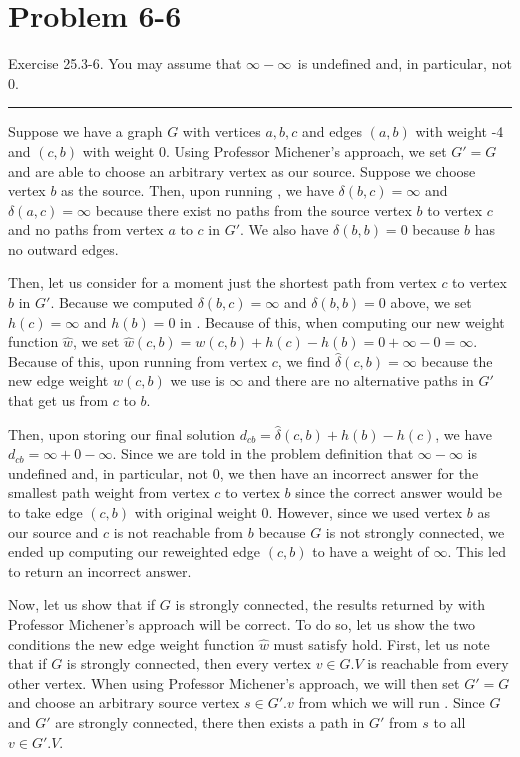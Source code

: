 \documentclass[11pt]{article}
\def\separateline{\medskip\hrule\medskip}
\begin{document}
\newpage


\section{Problem 6-6}
Exercise 25.3-6. You may assume that $\infty - \infty ~$ is undefined and, in particular, not 0.
\separateline

Suppose we have a graph $G$ with vertices $a,b,c$ and edges $(a,b)$ with weight -4 and $(c,b)$ with weight 0. Using Professor Michener's approach, we set $G' = G$ and are able to choose an arbitrary vertex as our source. Suppose we choose vertex $b$ as the source. Then, upon running , we have $\delta{(b,c)} = \infty$ and $\delta{(a,c)} = \infty$ because there exist no paths from the source vertex $b$ to vertex $c$ and no paths from vertex $a$ to $c$ in $G'$. We also have $\delta{(b,b)} = 0$ because $b$ has no outward edges.

Then, let us consider for a moment just the shortest path from vertex $c$ to vertex $b$ in $G'$. Because we computed $\delta{(b,c)} = \infty$ and $\delta{(b,b)} = 0$ above, we set $h(c) = \infty$ and $h(b) = 0$ in . Because of this, when computing our new weight function $\hat{w}$, we set $\hat{w}(c,b) = w(c,b) + h(c) - h(b) = 0 + \infty - 0 = \infty$. Because of this, upon running  from vertex $c$, we find $\hat{\delta}(c,b) = \infty$ because the new edge weight $\hat{w}(c,b)$ we use is $\infty$ and there are no alternative paths in $G'$ that get us from $c$ to $b$.

Then, upon storing our final solution $d_{cb} = \hat{\delta}(c,b)+ h(b) - h(c)$, we have $d_{cb} = \infty + 0 - \infty$. Since we are told in the problem definition that $\infty - \infty$ is undefined and, in particular, not 0, we then have an incorrect answer for the smallest path weight from vertex $c$ to vertex $b$ since the correct answer would be to take edge $(c,b)$ with original weight 0. However, since we used vertex $b$ as our source and $c$ is not reachable from $b$ because $G$ is not strongly connected, we ended up computing our reweighted edge $(c,b)$ to have a weight of $\infty$. This led  to return an incorrect answer.

Now, let us show that if $G$ is strongly connected, the results returned by  with Professor Michener's approach will be correct. To do so, let us show the two conditions the new edge weight function $\hat{w}$ must satisfy hold. First, let us note that if $G$ is strongly connected, then every vertex $v \in G.V$ is reachable from every other vertex. When using Professor Michener's approach, we will then set $G' = G$ and choose an arbitrary source vertex $s \in G'.v$ from which we will run . Since $G$ and $G'$ are strongly connected, there then exists a path in $G'$ from $s$ to all $v \in G'.V$.
\end{document}
